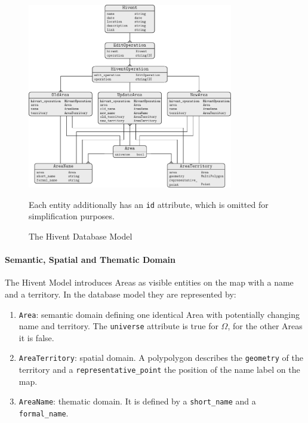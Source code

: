 \begin{figure}[ht]
  \centering
  \includegraphics[width=0.8\textwidth]{graphics/development/application/database_model}
  \caption{The Hivent Database Model}
  \small{Each entity additionally has an \texttt{id} attribute, which is omitted for simplification purposes.}
  \label{fig:database_model_er}
\end{figure}

\paragraph{Semantic, Spatial and Thematic Domain} %
\label{par:semantic_spatial_and_thematic_domain}

The Hivent Model introduces Areas as visible entities on the map with a name and a territory. In the database model they are represented by:

\begin{enumerate}
  \item \texttt{Area}: semantic domain defining one identical Area with potentially changing name and territory. The \texttt{universe} attribute is true for $\Omega$, for the other Areas it is false.
  \item \texttt{AreaTerritory}: spatial domain. A polypolygon describes the \texttt{geometry} of the territory and a \texttt{representative\_point} the position of the name label on the map.
  \item \texttt{AreaName}: thematic domain. It is defined by a \texttt{short\_name} and a \texttt{formal\_name}.
\end{enumerate}

